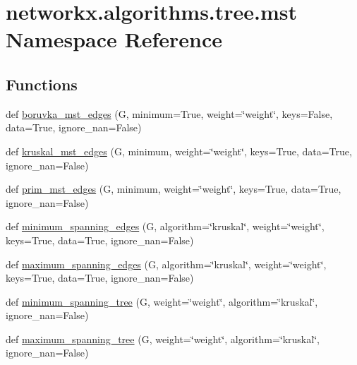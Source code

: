\hypertarget{namespacenetworkx_1_1algorithms_1_1tree_1_1mst}{}\section{networkx.\+algorithms.\+tree.\+mst Namespace Reference}
\label{namespacenetworkx_1_1algorithms_1_1tree_1_1mst}
\subsection*{Functions}
\begin{DoxyCompactItemize}
\item 
def \hyperlink{namespacenetworkx_1_1algorithms_1_1tree_1_1mst_adc998046a90df96d250698a10380b53b}{boruvka\+\_\+mst\+\_\+edges} (G, minimum=True, weight=\char`\"{}weight\char`\"{}, keys=False, data=True, ignore\+\_\+nan=False)
\item 
def \hyperlink{namespacenetworkx_1_1algorithms_1_1tree_1_1mst_a625cf66f46805703dd2c3fd26a33c689}{kruskal\+\_\+mst\+\_\+edges} (G, minimum, weight=\char`\"{}weight\char`\"{}, keys=True, data=True, ignore\+\_\+nan=False)
\item 
def \hyperlink{namespacenetworkx_1_1algorithms_1_1tree_1_1mst_afcb5cc4ca6b18390fbea4b2f2a64055b}{prim\+\_\+mst\+\_\+edges} (G, minimum, weight=\char`\"{}weight\char`\"{}, keys=True, data=True, ignore\+\_\+nan=False)
\item 
def \hyperlink{namespacenetworkx_1_1algorithms_1_1tree_1_1mst_ac8a6ab0fd620af1803b6ff0f2ade3898}{minimum\+\_\+spanning\+\_\+edges} (G, algorithm=\char`\"{}kruskal\char`\"{}, weight=\char`\"{}weight\char`\"{}, keys=True, data=True, ignore\+\_\+nan=False)
\item 
def \hyperlink{namespacenetworkx_1_1algorithms_1_1tree_1_1mst_affed092b6a627eb15629fe61ff1bec9d}{maximum\+\_\+spanning\+\_\+edges} (G, algorithm=\char`\"{}kruskal\char`\"{}, weight=\char`\"{}weight\char`\"{}, keys=True, data=True, ignore\+\_\+nan=False)
\item 
def \hyperlink{namespacenetworkx_1_1algorithms_1_1tree_1_1mst_a50a0a335c8a2c0b9b52a659372939b48}{minimum\+\_\+spanning\+\_\+tree} (G, weight=\char`\"{}weight\char`\"{}, algorithm=\char`\"{}kruskal\char`\"{}, ignore\+\_\+nan=False)
\item 
def \hyperlink{namespacenetworkx_1_1algorithms_1_1tree_1_1mst_a990316971314e3505f15fc5b5976017a}{maximum\+\_\+spanning\+\_\+tree} (G, weight=\char`\"{}weight\char`\"{}, algorithm=\char`\"{}kruskal\char`\"{}, ignore\+\_\+nan=False)
\end{DoxyCompactItemize}
